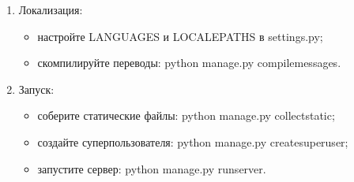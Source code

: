 \begin{enumerate}
	\item Локализация:
	\begin{itemize}
		\item настройте LANGUAGES и LOCALEPATHS в settings.py;
		\item скомпилируйте переводы: python manage.py compilemessages.
	\end{itemize}
	
	\item Запуск:
	\begin{itemize}
		\item соберите статические файлы: python manage.py collectstatic;
		\item создайте суперпользователя: python manage.py createsuperuser;
		\item запустите сервер: python manage.py runserver.
	\end{itemize}
\end{enumerate}